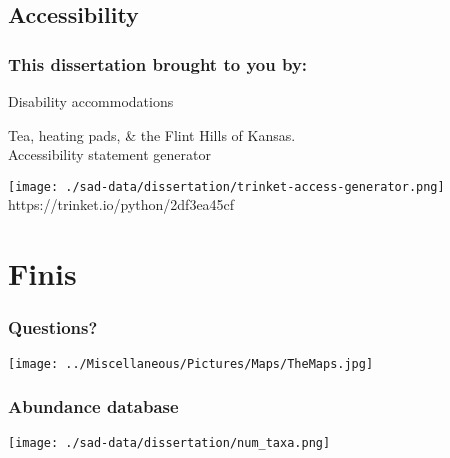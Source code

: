 \documentclass[14pt]{beamer}
\begin{document}
\subsection{Accessibility}
\begin{frame}[t]{}
\frametitle{This dissertation brought to you by:}
\begin{large}
Disability accommodations\\
\end{large}
Tea, heating pads, \& the Flint Hills of Kansas.\\
Accessibility statement generator
\begin{center}
\texttt{[image: ./sad-data/dissertation/trinket-access-generator.png]}\\
https://trinket.io/python/2df3ea45cf
\end{center}
\end{frame}

\section{Finis}
\begin{frame}[t]
\frametitle{Questions?}
\begin{center}
\texttt{[image: ../Miscellaneous/Pictures/Maps/TheMaps.jpg]}
\end{center}
\end{frame}

\begin{frame}{}
\frametitle{Abundance database}
\texttt{[image: ./sad-data/dissertation/num\_taxa.png]}
\end{frame}
\end{document}
